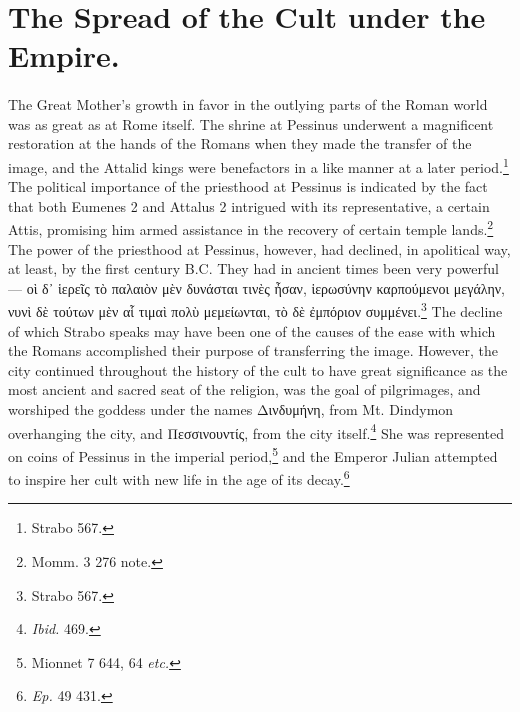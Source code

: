 \documentclass[a4paper, 11pt, oneside, polutonikogreek, english]{article}
\begin{document}
\section{The Spread of the Cult under the Empire.}
\paragraph{}
The Great Mother's growth in favor in the outlying parts of the Roman world was as great as at Rome itself. The shrine at Pessinus underwent a magnificent restoration at the hands of the Romans when they made the transfer of the image, and the Attalid kings were benefactors in a like manner at a later period.\footnote{Strabo 567.} The political importance of the priesthood at Pessinus is indicated by the fact that both Eumenes 2 and Attalus 2 intrigued with its representative, a certain Attis, promising him armed assistance in the recovery of certain temple lands.\footnote{Momm. 3 276 note.} The power of the priesthood at Pessinus, however, had declined, in apolitical way, at least, by the first century \textsc{B.C.} They had in ancient times been very powerful --- οὶ δ᾽ ἱερεῖς τὸ παλαιὸν μὲν δυνάσται τινὲς ἦσαν, ἱερωσύνην καρπούμενοι μεγάλην, νυνὶ δὲ τούτων μὲν αἷ τιμαὶ πολὺ μεμείωνται, τὸ δὲ ἐμπόριον συμμένει.\footnote{Strabo 567.} The decline of which Strabo speaks may have been one of the causes of the ease with which the Romans accomplished their purpose of transferring the image. However, the city continued throughout the history of the cult to have great significance as the most ancient and sacred seat of the religion, was the goal of pilgrimages, and worshiped the goddess under the names Δινδυμήνη, from Mt. Dindymon overhanging the city, and Πεσσινουντίς, from the city itself.\footnote{\emph{Ibid.} 469.} She was represented on coins of Pessinus in the imperial period,\footnote{Mionnet 7 644, 64 \emph{etc.}} and the Emperor Julian attempted to inspire her cult with new life in the age of its decay.\footnote{\emph{Ep.} 49 431.}
\end{document}
